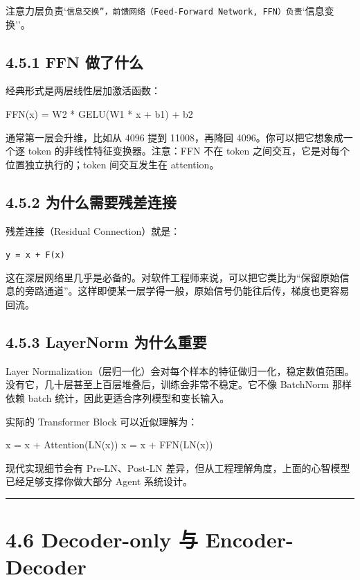 注意力层负责`\texttt{信息交换''，前馈网络（Feed-Forward Network, FFN）负责}`信息变换''。


\subsection{4.5.1 FFN 做了什么}

经典形式是两层线性层加激活函数：


\begin{codeblock}
FFN(x) = W2 * GELU(W1 * x + b1) + b2
\end{codeblock}

通常第一层会升维，比如从 4096 提到 11008，再降回 4096。你可以把它想象成一个逐 token 的非线性特征变换器。注意：FFN 不在 token 之间交互，它是对每个位置独立执行的；token 间交互发生在 attention。


\subsection{4.5.2 为什么需要残差连接}

残差连接（Residual Connection）就是：


\texttt{y = x + F(x)}


这在深层网络里几乎是必备的。对软件工程师来说，可以把它类比为``保留原始信息的旁路通道''。这样即便某一层学得一般，原始信号仍能往后传，梯度也更容易回流。


\subsection{4.5.3 LayerNorm 为什么重要}

Layer Normalization（层归一化）会对每个样本的特征做归一化，稳定数值范围。没有它，几十层甚至上百层堆叠后，训练会非常不稳定。它不像 BatchNorm 那样依赖 batch 统计，因此更适合序列模型和变长输入。


实际的 Transformer Block 可以近似理解为：


\begin{codeblock}
x = x + Attention(LN(x))
x = x + FFN(LN(x))
\end{codeblock}

现代实现细节会有 Pre-LN、Post-LN 差异，但从工程理解角度，上面的心智模型已经足够支撑你做大部分 Agent 系统设计。


\bigskip\hrule\bigskip

\section{4.6 Decoder-only 与 Encoder-Decoder}

